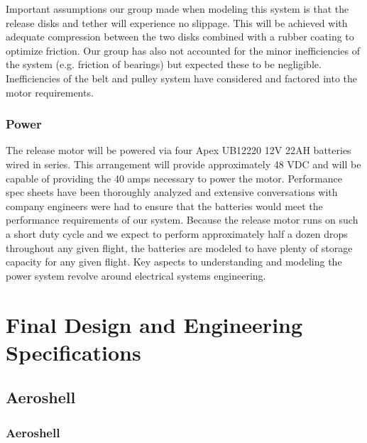 Important assumptions our group made when modeling this system is that the release disks and tether will experience no slippage. This will be achieved with adequate compression between the two disks combined with a rubber coating to optimize friction. Our group has also not accounted for the minor inefficiencies of the system (e.g. friction of bearings) but expected these to be negligible. Inefficiencies of the belt and pulley system have considered and factored into the motor requirements. 

\subsubsection{Power}

\indent\indent The release motor will be powered via four Apex UB12220 12V 22AH batteries wired in series. This arrangement will provide approximately 48 VDC and will be capable of providing the 40 amps necessary to power the motor. Performance spec sheets have been thoroughly analyzed and extensive conversations with company engineers were had to ensure that the batteries would meet the performance requirements of our system. Because the release motor runs on such a short duty cycle and we expect to perform approximately half a dozen drops throughout any given flight, the batteries are modeled to have plenty of storage capacity for any given flight. Key aspects to understanding and modeling the power system revolve around electrical systems engineering.



\section{Final Design and Engineering Specifications}

\subsection{Aeroshell}

\subsubsection{Aeroshell}

